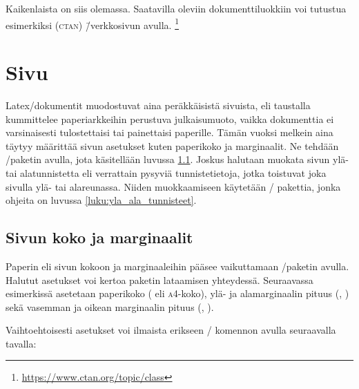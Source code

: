 Kaikenlaista on siis olemassa. Saatavilla oleviin dokumenttiluokkiin voi
tutustua esimerkiksi 
(\textsc{ctan}) \=/verkkosivun avulla.%
\footnote{\url{https://www.ctan.org/topic/class}}

\section{Sivu}
\label{luku:sivuasetukset}

Latex\-/dokumentit muodostuvat aina peräkkäisistä sivuista, eli
taustalla kummittelee paperiarkkeihin perustuva julkaisumuoto, vaikka
dokumenttia ei varsinaisesti tulostettaisi tai painettaisi paperille.
Tämän vuoksi melkein aina täytyy määrittää sivun asetukset kuten
paperikoko ja marginaalit. Ne tehdään \-/paketin
avulla, jota käsitellään luvussa \ref{luku:sivun_mitat}. Joskus halutaan
muokata sivun ylä- tai alatunnistetta eli verrattain pysyviä
tunnistetietoja, jotka toistuvat joka sivulla ylä- tai alareunassa.
Niiden muokkaamiseen käytetään \-/ pakettia, jonka
ohjeita on luvussa \ref{luku:yla_ala_tunnisteet}.

\subsection{Sivun koko ja marginaalit}
\label{luku:sivun_mitat}

Paperin eli sivun kokoon ja marginaaleihin pääsee vaikuttamaan
\-/paketin avulla. Halutut asetukset
voi kertoa paketin lataamisen yhteydessä. Seuraavassa esimerkissä
asetetaan paperikoko ( eli \textsc{a4}-koko), ylä- ja
alamarginaalin pituus (, ) sekä vasemman ja
oikean marginaalin pituus (, ).

\begin{koodilohkosis}
\usepackage[a4paper, top=20mm, bottom=30mm,
  left=20mm, right=20mm]{geometry}
\end{koodilohkosis}

Vaihtoehtoisesti asetukset voi ilmaista erikseen \-/
komennon avulla seuraavalla tavalla:

\begin{koodilohkosis}
\usepackage{geometry}
\geometry{a4paper, top=20mm, bottom=30mm, left=20mm, right=20mm}
\end{koodilohkosis}

